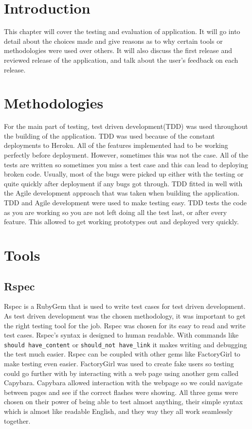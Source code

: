 \section{Introduction}
This chapter will cover the testing and evaluation of application. It will go into detail about the choices made and give reasons as to why certain tools or methodologies were used over others. It will also discuss the first release and reviewed release of the application, and talk about the user's feedback on each release.\\

\section{Methodologies}
For the main part of testing, test driven development(TDD) was used throughout the building of the application. TDD was used because of the constant deployments to Heroku. All of the features implemented had to be working perfectly before deployment. However, sometimes this was not the case. All of the tests are written so sometimes you miss a test case and this can lead to deploying broken code. Usually, most of the bugs were picked up either with the testing or quite quickly after deployment if any bugs got through. TDD fitted in well with the Agile development approach that was taken when building the application. TDD and Agile development were used to make testing easy. TDD tests the code as you are working so you are not left doing all the test last, or after every feature. This allowed to get working prototypes out and deployed very quickly.\\

\section{Tools}
\subsection{Rspec}
Rspec is a RubyGem that is used to write test cases for test driven development. As test driven development was the chosen methodology, it was important to get the right testing tool for the job. Rspec was chosen for its easy to read and write test cases. Rspec's syntax is designed to human readable. With commands like \lstinline{should have_content} or \lstinline{should_not have_link} it makes writing and debugging the test much easier. Rspec can be coupled with other gems like FactoryGirl to make testing even easier. FactoryGirl was used to create fake users so testing could go further with by interacting with a web page using another gem called Capybara. Capybara allowed interaction with the webpage so we could navigate between pages and see if the correct flashes were showing. All three gems were chosen on their power of being able to test almost anything, their simple syntax which is almost like readable English, and they way they all work seamlessly together.

